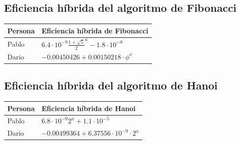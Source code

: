 \documentclass[a4paper, 11pt]{article}
\begin{document}
\subsection{Eficiencia híbrida del algoritmo de Fibonacci}
\begin{tabular}{|l|l|}
	\hline
	Persona & Eficiencia híbrida de Fibonacci \\
	\hline
 Pablo & $6.4 \cdot 10^{-9} \frac{1 + \sqrt{5}}{2}^n -1.8\cdot 10^{-8}$\\
 \hline
 Dario & $-0.00450426 +0.00150218\cdot\phi^x $
\end{tabular}

\subsection{Eficiencia híbrida del algoritmo de Hanoi}
\begin{tabular}{|l|l|}
	\hline
	Persona & Eficiencia híbrida de Hanoi \\
	\hline
 Pablo & $6.8 \cdot 10^{-9} 2^n + 1.1 \cdot 10^{-5}$\\
 \hline 
 Dario & $ -0.00499364+ 6.37556\cdot 10^{-9}\cdot 2^x$\\
 \hline
\end{tabular}
\end{document}
